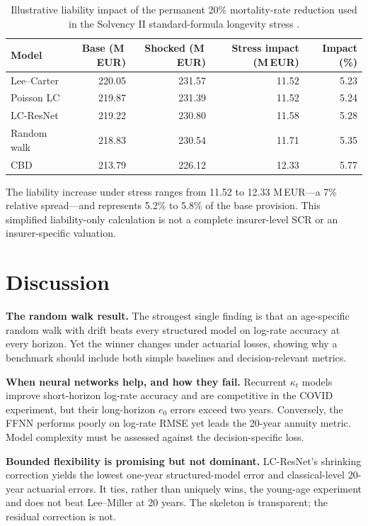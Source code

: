 \documentclass[11pt,a4paper]{article}
\begin{document}
\begin{table}[htbp]
\centering
\caption{Illustrative liability impact of the permanent 20\% mortality-rate reduction used in the Solvency II standard-formula longevity stress \citep{eiopa2026article138}.}
\label{tab:stress}
\small
\begin{tabular}{l r r r r}
\toprule
Model & Base (M\,EUR) & Shocked (M\,EUR) & Stress impact (M\,EUR) & Impact (\%) \\
\midrule
Lee--Carter  & 220.05 & 231.57 & 11.52 & 5.23 \\
Poisson LC   & 219.87 & 231.39 & 11.52 & 5.24 \\
LC-ResNet    & 219.22 & 230.80 & 11.58 & 5.28 \\
Random walk  & 218.83 & 230.54 & 11.71 & 5.35 \\
CBD          & 213.79 & 226.12 & 12.33 & 5.77 \\
\bottomrule
\end{tabular}
\end{table}

The liability increase under stress ranges from 11.52 to 12.33 M\,EUR---a 7\% relative spread---and represents 5.2\% to 5.8\% of the base provision. This simplified liability-only calculation is not a complete insurer-level SCR or an insurer-specific valuation.

\section{Discussion}
\label{sec:discussion}

\textbf{The random walk result.} The strongest single finding is that an age-specific random walk with drift beats every structured model on log-rate accuracy at every horizon. Yet the winner changes under actuarial losses, showing why a benchmark should include both simple baselines and decision-relevant metrics.

\textbf{When neural networks help, and how they fail.} Recurrent $\kappa_t$ models improve short-horizon log-rate accuracy and are competitive in the COVID experiment, but their long-horizon $e_0$ errors exceed two years. Conversely, the FFNN performs poorly on log-rate RMSE yet leads the 20-year annuity metric. Model complexity must be assessed against the decision-specific loss.

\textbf{Bounded flexibility is promising but not dominant.} LC-ResNet's shrinking correction yields the lowest one-year structured-model error and classical-level 20-year actuarial errors. It ties, rather than uniquely wins, the young-age experiment and does not beat Lee--Miller at 20 years. The skeleton is transparent; the residual correction is not.
\end{document}
